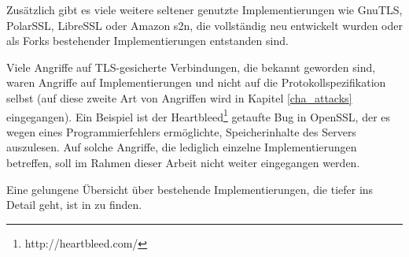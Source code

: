 Zusätzlich gibt es viele weitere seltener genutzte Implementierungen wie GnuTLS, PolarSSL, LibreSSL oder Amazon s2n, die vollständig neu entwickelt wurden oder als Forks bestehender Implementierungen entstanden sind.

Viele Angriffe auf TLS-gesicherte Verbindungen, die bekannt geworden sind, waren Angriffe auf Implementierungen und nicht auf die Protokollspezifikation selbst (auf diese zweite Art von Angriffen wird in Kapitel \ref{cha_attacks} eingegangen). Ein Beispiel ist der Heartbleed\footnote{http://heartbleed.com/} getaufte Bug in OpenSSL, der es wegen eines Programmierfehlers ermöglichte, Speicherinhalte des Servers auszulesen. Auf solche Angriffe, die lediglich einzelne Implementierungen betreffen, soll im Rahmen dieser Arbeit nicht weiter eingegangen werden.

Eine gelungene Übersicht über bestehende Implementierungen, die tiefer ins Detail geht, ist in \cite{meyer14} zu finden.
